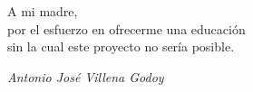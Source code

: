 
\cleardoublepage
\thispagestyle{empty} %

\begin{minipage}[c][\textheight][c]{\textwidth}
\raggedleft

A mi madre, \\
por el esfuerzo en ofrecerme una educación\\
sin la cual este proyecto no sería posible.

\bigskip

\emph{Antonio José Villena Godoy}

\end{minipage}

\blankpage
